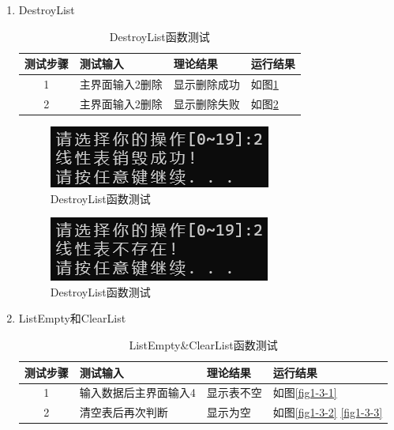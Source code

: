 \documentclass[supercite]{Experimental_Report}
\theoremstyle{definition}
\begin{document}
\begin{enumerate}
	
	\item DestroyList
	\begin{table}[h!]
		\begin{center}
			\caption{DestroyList函数测试}
			\begin{tabular}{|c|p{4cm}<{\centering}|p{4cm}<{\centering}|p{4cm}<{\centering}|} 
				\hline
				\textbf{测试步骤} & \textbf{测试输入} & \textbf{理论结果} & \textbf{运行结果} \\
				\hline
				1 & 主界面输入2删除 & 显示删除成功 & 如图\ref{fig1-2-1}\\
				\hline
				2 & 主界面输入2删除 & 显示删除失败 & 如图\ref{fig1-2-2}\\
				\hline
			\end{tabular}
		\end{center}
	\end{table}
	
	
	\begin{figure}[H] %
		\begin{center}
			\includegraphics[width=0.5\linewidth]{images/linklist/2-1.png}
			\caption{DestroyList函数测试}
			\label{fig1-2-1}
		\end{center}
	\end{figure}
	\begin{figure}[H] %
		\begin{center}
			\includegraphics[width=0.5\linewidth]{images/linklist/2-2.png}
			\caption{DestroyList函数测试}
			\label{fig1-2-2}
		\end{center}
	\end{figure}
	
	\item ListEmpty和ClearList
	\begin{table}[h!]
		\begin{center}
			\caption{ListEmpty\&ClearList函数测试}
			\begin{tabular}{|c|p{4cm}<{\centering}|p{4cm}<{\centering}|p{4cm}<{\centering}|} 
				\hline
				\textbf{测试步骤} & \textbf{测试输入} & \textbf{理论结果} & \textbf{运行结果} \\
				\hline
				1 & 输入数据后主界面输入4 & 显示表不空 & 如图\ref{fig1-3-1}\\
				\hline
				2 & 清空表后再次判断 & 显示为空 & 如图\ref{fig1-3-2} \ref{fig1-3-3}\\
				\hline
			\end{tabular}
		\end{center}
	\end{table}
	

\end{enumerate}
\end{document}
